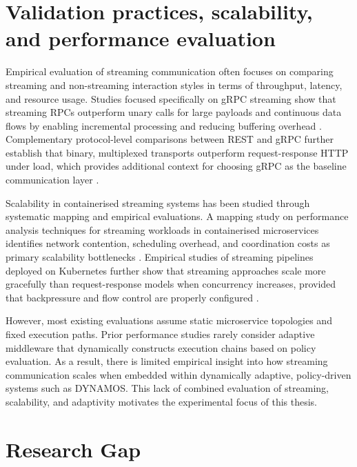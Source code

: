 \section{Validation practices, scalability, and performance evaluation}

Empirical evaluation of streaming communication often focuses on comparing streaming and non-streaming interaction styles in terms of throughput, latency, and resource usage. Studies focused specifically on gRPC streaming show that streaming RPCs outperform unary calls for large payloads and continuous data flows by enabling incremental processing and reducing buffering overhead \cite{roohitavaf2019logplayer,sodankoor2026grpcbench}. Complementary protocol-level comparisons between REST and gRPC further establish that binary, multiplexed transports outperform request-response HTTP under load, which provides additional context for choosing gRPC as the baseline communication layer \cite{restgrpccomparison,lahtevenoja2021communication}.

Scalability in containerised streaming systems has been studied through systematic mapping and empirical evaluations. A mapping study on performance analysis techniques for streaming workloads in containerised microservices identifies network contention, scheduling overhead, and coordination costs as primary scalability bottlenecks \cite{systematicstreaming}. Empirical studies of streaming pipelines deployed on Kubernetes further show that streaming approaches scale more gracefully than request-response models when concurrency increases, provided that backpressure and flow control are properly configured \cite{starck2023streaminglb}.

However, most existing evaluations assume static microservice topologies and fixed execution paths. Prior performance studies rarely consider adaptive middleware that dynamically constructs execution chains based on policy evaluation. As a result, there is limited empirical insight into how streaming communication scales when embedded within dynamically adaptive, policy-driven systems such as DYNAMOS. This lack of combined evaluation of streaming, scalability, and adaptivity motivates the experimental focus of this thesis.

\section{Research Gap}\label{sec:research-gap}

